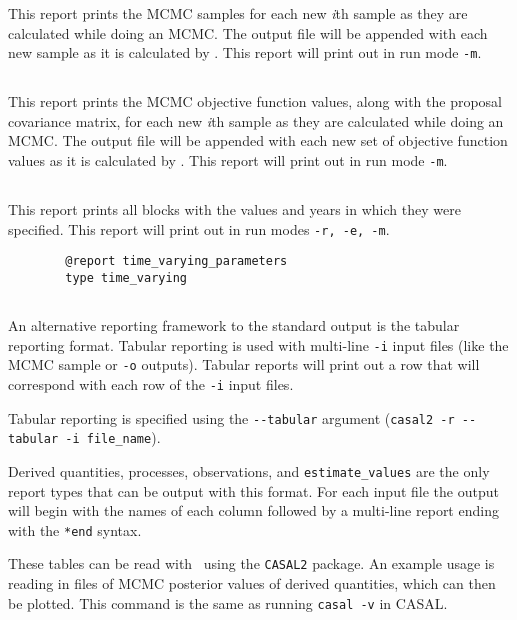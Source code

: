 This report prints the MCMC samples for each new \textit{i}th sample as they are calculated while doing an MCMC. The output file will be appended with each new sample as it is calculated by \CNAME. This report will print out in run mode \texttt{-m}.

\subsection{}

This report prints the MCMC objective function values, along with the proposal covariance matrix, for each new \textit{i}th sample as they are calculated while doing an MCMC. The output file will be appended with each new set of objective function values as it is calculated by \CNAME. This report will print out in run mode \texttt{-m}.

\subsection{}

This report prints all  blocks with the values and years in which they were specified. This report will print out in run modes \texttt{-r, -e, -m}.

{\small{\begin{verbatim}
		@report time_varying_parameters
		type time_varying
		\end{verbatim}}}

\subsection{}\label{sub:tabular}

An alternative reporting framework to the standard output is the tabular reporting format. Tabular reporting is used with multi-line \texttt{-i} input files (like the MCMC sample or \texttt{-o} outputs). Tabular reports will print out a row that will correspond with each row of the \texttt{-i} input files.

Tabular reporting is specified using the \texttt{-{}-tabular} argument (\texttt{casal2 -r -{}-tabular -i file\_name}).

Derived quantities, processes, observations, and \texttt{estimate\_values} are the only report types that can be output with this format. For each input file the output will begin with the names of each column followed by a multi-line report ending with the \texttt{*end} syntax.

These tables can be read with \R\ using the \texttt{CASAL2} package. An example usage is reading in files of MCMC posterior values of derived quantities, which can then be plotted. This command is the same as running \texttt{casal -v} in CASAL.


